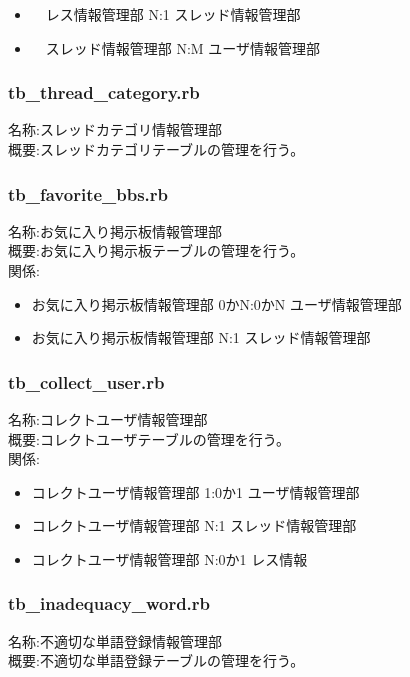 \documentclass[a4j]{jarticle}
\begin{document}
  \begin{itemize}
  \item　レス情報管理部 N:1 スレッド情報管理部
  \item　スレッド情報管理部 N:M ユーザ情報管理部
  \end{itemize}

\subsubsection{tb\_thread\_category.rb}
  \noindent
  名称:スレッドカテゴリ情報管理部\\
  概要:スレッドカテゴリテーブルの管理を行う。\\

\subsubsection{tb\_favorite\_bbs.rb}
  \noindent
  名称:お気に入り掲示板情報管理部\\
  概要:お気に入り掲示板テーブルの管理を行う。\\
  関係:
  \begin{itemize}
  \item お気に入り掲示板情報管理部 0かN:0かN ユーザ情報管理部
  \item お気に入り掲示板情報管理部 N:1 スレッド情報管理部
  \end{itemize}

\subsubsection{tb\_collect\_user.rb}
  \noindent
  名称:コレクトユーザ情報管理部\\
  概要:コレクトユーザテーブルの管理を行う。\\
  関係:
  \begin{itemize}
  \item コレクトユーザ情報管理部 1:0か1 ユーザ情報管理部
  \item コレクトユーザ情報管理部 N:1 スレッド情報管理部
  \item コレクトユーザ情報管理部 N:0か1 レス情報
  \end{itemize}

\subsubsection{tb\_inadequacy\_word.rb}
  \noindent
  名称:不適切な単語登録情報管理部\\
  概要:不適切な単語登録テーブルの管理を行う。\\
\end{document}
